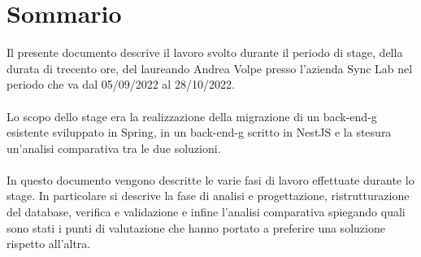 
\cleardoublepage
{}
{}
\begingroup
\let\clearpage\relax
\let\cleardoublepage\relax
\let\cleardoublepage\relax

\chapter*{Sommario}

Il presente documento descrive il lavoro svolto durante il periodo di stage, della durata di trecento ore, del
laureando Andrea Volpe presso l'azienda Sync Lab nel periodo che va dal 05/09/2022 al 28/10/2022.
\\\\
Lo scopo dello stage era la realizzazione della migrazione di un \gls{back-end-g} esistente sviluppato in Spring, in un \gls{back-end-g}
scritto in NestJS e la stesura un'analisi comparativa tra le due soluzioni.
\\\\
In questo documento vengono descritte le varie fasi di lavoro effettuate durante lo stage. In particolare si descrive la fase
di analisi e progettazione, ristrutturazione del database, verifica e validazione e infine l'analisi comparativa spiegando
quali sono stati i punti di valutazione che hanno portato a preferire una soluzione rispetto all'altra.

%
%

\endgroup			

\vfill


